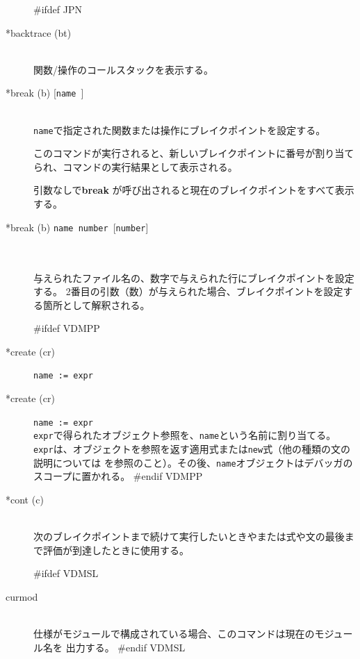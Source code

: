 \documentclass[\pformat,12pt]{article}
\begin{document}
\begin{description}
#ifdef JPN
\item[*backtrace (bt)] \mbox{}\\
  関数/操作のコールスタックを表示する。
  
\item[*break (b) \mbox{[{\tt name }]}] 
\mbox{}\\
  {\tt name}で指定された関数または操作にブレイクポイントを設定する。\\
  
  このコマンドが実行されると、新しいブレイクポイントに番号が割り当てられ、コマンドの実行結果として表示される。

  引数なしで\textbf{break} が呼び出されると現在のブレイクポイントをすべて表示する。

\item[*break (b) \mbox{\texttt{name number} [\texttt{number}]}]\mbox{}\\
\mbox{}\\
 与えられたファイル名の、数字で与えられた行にブレイクポイントを設定する。
 2番目の引数（数）が与えられた場合、ブレイクポイントを設定する箇所として解釈される。
 
#ifdef VDMPP
\item[*create (cr)] {\tt name := expr}\mbox{}\\
\item[*create (cr)] {\tt name := expr}\mbox{}\\
  {\tt expr}で得られたオブジェクト参照を、{\tt name}という名前に割り当てる。
  {\tt expr}は、オブジェクトを参照を返す適用式または{\tt new}式（他の種類の文の説明については
  \cite{LangManPP-SCSK}を参照のこと）。その後、{\tt name}オブジェクトはデバッガのスコープに置かれる。
#endif VDMPP

\item[*cont (c)] \mbox{}\\
  次のブレイクポイントまで続けて実行したいときやまたは式や文の最後まで評価が到達したときに使用する。

#ifdef VDMSL
\item[curmod] \mbox{}\\
  仕様がモジュールで構成されている場合、このコマンドは現在のモジュール名を
  出力する。
#endif VDMSL


\end{description}
\end{document}
